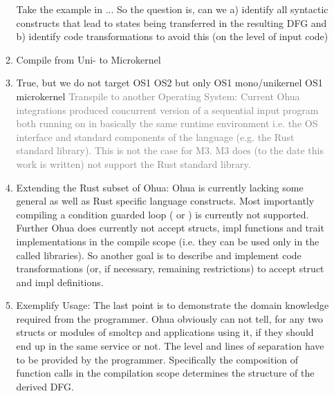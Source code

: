\begin{itemize}
\begin{enumerate}
        Take the example in  ... 
        So the question is, can we a) identify all syntactic constructs that lead to states being transferred in the resulting DFG and b) identify code transformations to avoid this (on the level of input code)
        \item Compile from Uni- to Microkernel 
        \item True, but we do not target OS1 \means OS2 but only OS1 mono/unikernel \means OS1 microkernel \textcolor{gray}{Transpile to another Operating System: Current Ohua integrations  produced concurrent version of a sequential input program both running on in basically the same runtime environment i.e. the OS interface and standard components of the language (e.g. the Rust standard library). This is not the case for M3. M3 does (to the date this work is written) not support the Rust standard library. }
        \item Extending the Rust subset of Ohua: Ohua is currently lacking some general as well as Rust specific language constructs. Most importantly compiling a condition guarded loop ( or ) is currently not supported. Further Ohua does currently not accept structs, impl functions and trait implementations in the compile scope (i.e. they can be used only in the called libraries). So another goal is to describe and implement code transformations (or, if necessary, remaining restrictions) to accept struct and impl definitions. 
        
        \item Exemplify Usage: The last point is to demonstrate the domain knowledge required from the programmer. Ohua obviously can not tell, for any two structs or modules of smoltcp and applications using it, if they should end up in the same service or not. The level and lines of separation have to be provided by the programmer. Specifically the composition of function calls in the compilation scope determines the structure of the derived DFG. 
    \end{enumerate}
   
\end{itemize}
